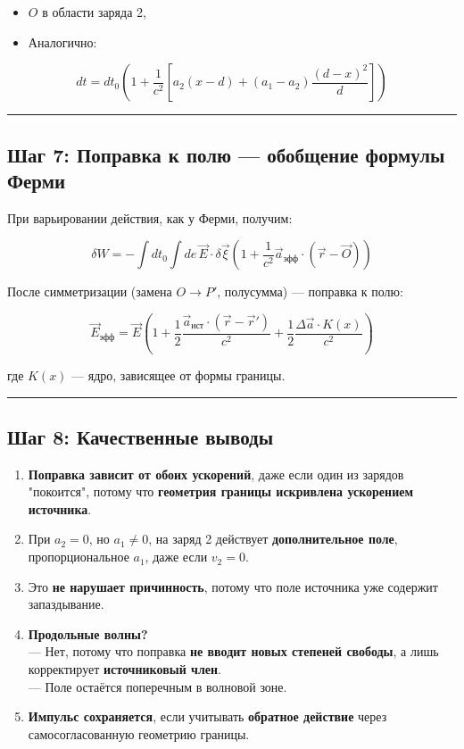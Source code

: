 \documentclass[11pt]{article}
\providecommand{\tightlist}{%
      \setlength{\itemsep}{0pt}\setlength{\parskip}{0pt}}
\begin{document}
\begin{itemize}
\tightlist
\item
  \(O\) в области заряда 2,
\item
  Аналогично:
\end{itemize}

\[
dt = dt_0 \left( 1 + \frac{1}{c^2} \left[ a_2 (x - d) + (a_1 - a_2) \frac{(d - x)^2}{d} \right] \right)
\]

\begin{center}\rule{0.5\linewidth}{\linethickness}\end{center}

\subsection{ Шаг 7: Поправка к полю --- обобщение формулы Ферми}

При варьировании действия, как у Ферми, получим:

\[
\delta W = - \int dt_0 \int de \, \vec{E} \cdot \delta \vec{\xi} \left( 1 + \frac{1}{c^2} \vec{a}_{\text{эфф}} \cdot (\vec{r} - \vec{O}) \right)
\]

После симметризации (замена \(O \to P'\), полусумма) --- поправка к
полю:

\[
\vec{E}_{\text{эфф}} = \vec{E} \left( 1 + \frac{1}{2} \frac{\vec{a}_{\text{ист}} \cdot (\vec{r} - \vec{r}')}{c^2} + \frac{1}{2} \frac{\Delta \vec{a} \cdot K(x)}{c^2} \right)
\]

где \(K(x)\) --- ядро, зависящее от формы границы.

\begin{center}\rule{0.5\linewidth}{\linethickness}\end{center}

\subsection{ Шаг 8: Качественные выводы}

\begin{enumerate}
\def\labelenumi{\arabic{enumi}.}
\tightlist
\item
   \textbf{Поправка зависит от обоих ускорений}, даже если один из
  зарядов "покоится", потому что \textbf{геометрия границы искривлена
  ускорением источника}.
\item
   При \(a_2 = 0\), но \(a_1 \ne 0\), на заряд 2 действует
  \textbf{дополнительное поле}, пропорциональное \(a_1\), даже если
  \(v_2 = 0\).
\item
   Это \textbf{не нарушает причинность}, потому что поле источника уже
  содержит запаздывание.
\item
   \textbf{Продольные волны?}\\
  --- Нет, потому что поправка \textbf{не вводит новых степеней
  свободы}, а лишь корректирует \textbf{источниковый член}.\\
  --- Поле остаётся поперечным в волновой зоне.
\item
   \textbf{Импульс сохраняется}, если учитывать \textbf{обратное
  действие} через самосогласованную геометрию границы.
\end{enumerate}
\end{document}
